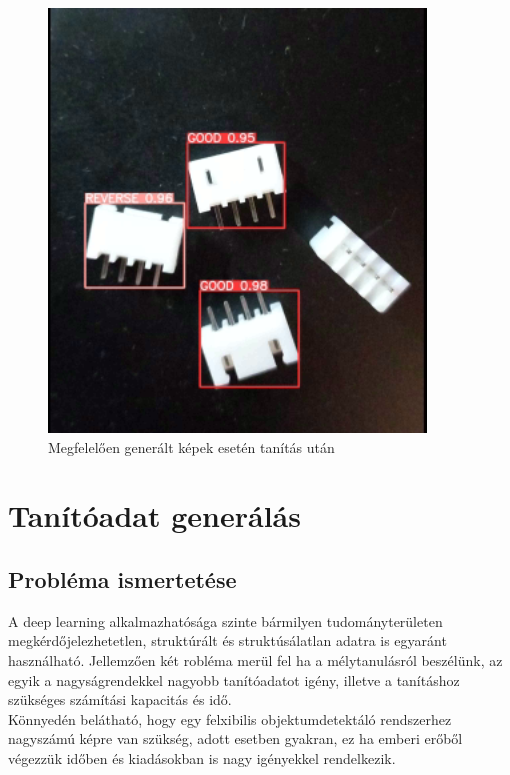 \documentclass{article}
\begin{document}
\begin{figure}[h]
  \centering
  \includegraphics[scale=0.7]{jo.png}
  \caption{Megfelelően generált képek esetén tanítás után}
\end{figure}
\section{Tanítóadat generálás}
\subsection{Probléma ismertetése}
A deep learning alkalmazhatósága szinte bármilyen tudományterületen 
megkérdőjelezhetetlen, struktúrált és struktúsálatlan adatra is egyaránt 
használható. Jellemzően két robléma merül fel ha a mélytanulásról beszélünk, 
az egyik a nagyságrendekkel nagyobb tanítóadatot igény, illetve a tanításhoz 
szükséges számítási kapacitás és idő.\\[5pt]
Könnyedén belátható, hogy egy felxibilis objektumdetektáló rendszerhez 
nagyszámú képre van szükség, adott esetben gyakran, ez ha emberi erőből végezzük 
időben és kiadásokban is nagy igényekkel rendelkezik.
\end{document}

